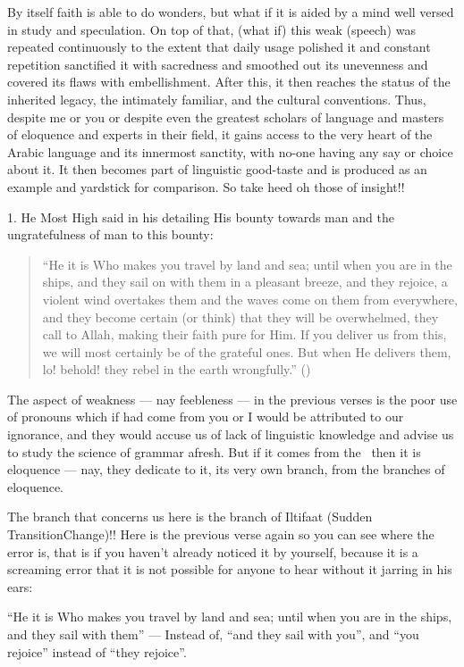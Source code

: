 \documentclass[12pt]{memoir}
\begin{document}
By itself faith is able to do wonders, but what if it is aided
by a mind well versed in study and speculation.
On top of that, (what if) this weak (speech) was repeated continuously
to the extent that daily usage polished it and constant repetition sanctified
it with sacredness and smoothed out its unevenness
and covered its flaws with embellishment.
After this, it then reaches the status of the inherited legacy,
the intimately familiar, and the cultural conventions.
Thus, despite me or you or despite even the greatest scholars of language
and masters of eloquence and experts in their field,
it gains access to the very heart of the Arabic language
and its innermost sanctity, with no-one having any say or choice about it.
It then becomes part of linguistic good-taste and is produced as an example
and yardstick for comparison. So take heed oh those of insight!!

1. He Most High said in his detailing His bounty towards man
and the ungratefulness of man to this bounty:

\begin{quote}
“He it is Who makes you travel by land and sea;
until when you are in the ships, and they sail on with them
in a pleasant breeze, and they rejoice, a violent wind overtakes them
and the waves come on them from everywhere,
and they become certain (or think) that they will be overwhelmed,
they call to Allah, making their faith pure for Him.
If you deliver us from this, we will most certainly be of the grateful ones.
But when He delivers them, lo! behold! they rebel in the earth wrongfully.”
()
\end{quote}

The aspect of weakness — nay feebleness — in the previous verses
is the poor use of pronouns which if had come from you
or I would be attributed to our ignorance,
and they would accuse us of lack of linguistic knowledge
and advise us to study the science of grammar afresh.
But if it comes from the \Quran\ then it is eloquence —
nay, they dedicate to it, its very own branch, from the branches of eloquence.

The branch that concerns us here is the branch of Iltifaat
(Sudden Transition\/Change)!!
Here is the previous verse again so you can see where the error is,
that is if you haven’t already noticed it by yourself,
because it is a screaming error that it is not possible
for anyone to hear without it jarring in his ears:

“He it is Who makes you travel by land and sea;
until when you are in the ships, and they sail with them” —
Instead of, “and they sail with you”,
and “you rejoice” instead of “they rejoice”.
\end{document}
